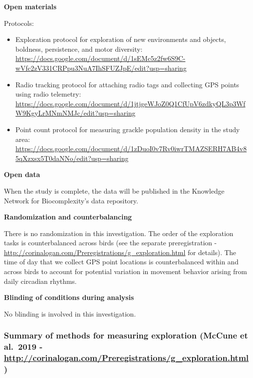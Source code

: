\documentclass[
]{article}
\providecommand{\tightlist}{%
  \setlength{\itemsep}{0pt}\setlength{\parskip}{0pt}}
\begin{document}
\textbf{Open materials}

Protocols:

\begin{itemize}
\tightlist
\item
  Exploration protocol for exploration of new environments and objects,
  boldness, persistence, and motor diversity:
  \url{https://docs.google.com/document/d/1sEMc5z2fw6S9C-wVfc2zV331CRPpu3NuA7IhSFUZJpE/edit?usp=sharing}
\item
  Radio tracking protocol for attaching radio tags and collecting GPS
  points using radio telemetry:
  \url{https://docs.google.com/document/d/1jtjgeWJoZ0Q1CfUpV6zdkyQL3p3WfW9KgyLrMNmNMJc/edit?usp=sharing}
\item
  Point count protocol for measuring grackle population density in the
  study area:
  \url{https://docs.google.com/document/d/1zDuoI0v7Rv0iwrTMAZSERH7AB4v85qXzxsx5T0daNNo/edit?usp=sharing}
\end{itemize}

\textbf{Open data}

When the study is complete, the data will be published in the Knowledge
Network for Biocomplexity's data repository.

\textbf{Randomization and counterbalancing}

There is no randomization in this investigation. The order of the
exploration tasks is counterbalanced across birds (see the separate
preregistration -
\url{http://corinalogan.com/Preregistrations/g_exploration.html} for
details). The time of day that we collect GPS point locations is
counterbalanced within and across birds to account for potential
variation in movement behavior arising from daily circadian rhythms.

\textbf{Blinding of conditions during analysis}

No blinding is involved in this investigation.

\hypertarget{summary-of-methods-for-measuring-exploration-mccune-et-al.-2019---httpcorinalogan.compreregistrationsg_exploration.html}{%
\subsubsection{\texorpdfstring{Summary of methods for measuring
exploration (McCune et al.~2019 -
\url{http://corinalogan.com/Preregistrations/g_exploration.html})}{Summary of methods for measuring exploration (McCune et al.~2019 - http://corinalogan.com/Preregistrations/g\_exploration.html)}}\label{summary-of-methods-for-measuring-exploration-mccune-et-al.-2019---httpcorinalogan.compreregistrationsg_exploration.html}}
\end{document}
